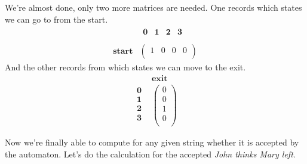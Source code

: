 %
We're almost done, only two more matrices are needed.
One records which states we can go to from the start.
%
\[
    \begin{array}{cc}
        &
        \begin{array}{cccc}
            \textbf{0} &
            \textbf{1} &
            \textbf{2} &
            \textbf{3} \\
        \end{array}
        \\
        \textbf{start}
        &
        \left (
            \begin{array}{cccc}
                1 & 0 & 0 & 0\\
            \end{array}
        \right )
    \end{array}
\]
%
And the other records from which states we can move to the exit.
\[
    \begin{array}{cc}
        &
        \textbf{exit}
        \\
        \begin{array}{c}
            \textbf{0} \\
            \textbf{1} \\
            \textbf{2} \\
            \textbf{3} \\
        \end{array}
        &
        \left (
            \begin{array}{c}
                0 \\
                0 \\
                1 \\
                0 \\
            \end{array}
        \right )
    \end{array}
\]

Now we're finally able to compute for any given string whether it is accepted by the automaton.
Let's do the calculation for the accepted \emph{John thinks Mary left}.

